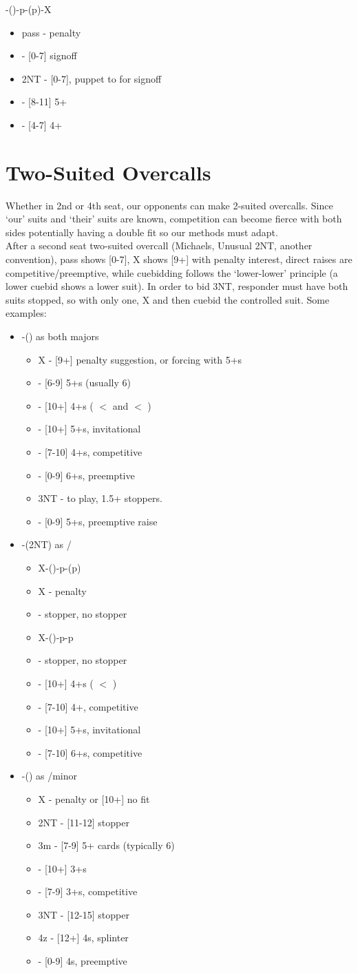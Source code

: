 \documentclass[12pt]{report}
\newcommand{\n}{\\}
\newcommand{\q}[1]{\multido{}{#1}{\qquad}}
\newcommand{\ul}[1]{\begin{itemize}#1\end{itemize}}
\newcommand{\li}[1]{\item[~] \q{#1}}
\begin{document}
    -()-p-(p)-X
    \ul{
        \li0 pass - penalty
        \li0  - [0-7] signoff
        \li0 2NT - [0-7], puppet to \cl3 for signoff
        \li0 \cl3 - [8-11] 5+\cl{}
        \li0 \di3 - [4-7] 4+\di{}
    }
\section{Two-Suited Overcalls} \label{3:6}

    Whether in 2nd or 4th seat, our opponents can make 2-suited overcalls.  Since `our' suits and `their' suits are known, competition can become fierce with both sides potentially having a double fit so our methods must adapt. \n
    
    After a second seat two-suited overcall (Michaels, Unusual 2NT, another convention), pass shows [0-7], X shows [9+] with penalty interest, direct raises are competitive/preemptive, while cuebidding follows the `lower-lower' principle (a lower cuebid shows a lower suit). In order to bid 3NT, responder must have both suits stopped, so with only one, X and then cuebid the controlled suit. Some examples:

    \ul{
        \li0 -() as both majors \ul{
            \li0 X - [9+] penalty suggestion, or forcing with 5+\di{}s
            \li0 \di2 - [6-9] 5+\di{}s (usually 6)
            \li0 \he2 - [10+] 4+\cl{}s (\he{} $<$ \sp{} and \cl{} $<$ \di{})
            \li0 \sp2 - [10+] 5+\di{}s, invitational
            \li0 \cl3 - [7-10] 4+\cl{}s, competitive
            \li0 \di3 - [0-9] 6+\di{}s, preemptive
            \li0 3NT - to play, 1.5+ stoppers.
            \li0 \cl{4/5} - [0-9] 5+\cl{}s, preemptive raise
        }

        \li0 \di1-(2NT) as \cl{}/\he{} \ul{
            \li0 X-(\cl3)-p-(p)
                \li1 X - penalty
                \li1 \he3 - \he{} stopper, no \cl{} stopper
            \li0 X-(\he3)-p-p
                \li1 \sp3 - \cl{} stopper, no \he{} stopper
            \li0 \cl3 - [10+] 4+\di{}s (\di{} $<$ \sp{})
            \li0 \di3 - [7-10] 4+\di{}, competitive
            \li0 \he3 - [10+] 5+\sp{}s, invitational
            \li0 \sp3 - [7-10] 6+\sp{}s, competitive
        }

        \li0 \sp1-(\sp2) as \he{}/minor \ul{
            \li0 X - penalty or [10+] no fit
            \li0 2NT - [11-12] \he{} stopper
            \li0 3m - [7-9] 5+ cards (typically 6)
            \li0 \he3 - [10+] 3+\sp{}s
            \li0 \sp3 - [7-9] 3+\sp{}s, competitive
            \li0 3NT - [12-15] \he{} stopper
            \li0 4z - [12+] 4\sp{}s, splinter
            \li0 \sp4 - [0-9] 4\sp{}s, preemptive
        }
    }
\end{document}
